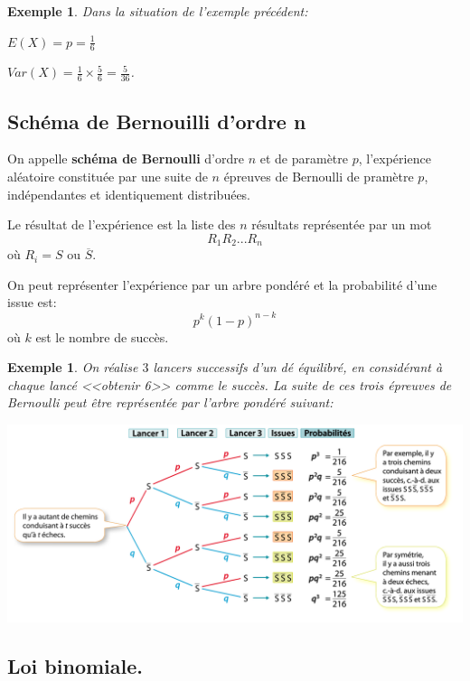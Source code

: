 \documentclass[a4paper,11pt]{article}
\theoremstyle{break}
\newcounter{enonce}
\newtheorem{exemple}[enonce]{Exemple}
\begin{document}
  \begin{exemple}
 Dans la situation de l'exemple précédent:
 
 $E(X)=p=\frac{1}{6}$
 
 $Var(X)=\frac{1}{6} \times \frac{5}{6}=\frac{5}{36}$.
  
 \end{exemple}
 
 \newpage
 \subsection{Schéma de Bernouilli d'ordre n}

  
  \begin{definition}
  On appelle \textbf{schéma de Bernoulli} d'ordre $n$ et de paramètre $p$, 
  l'expérience aléatoire constituée
  par une suite de $n$ épreuves de Bernoulli de pramètre $p$, indépendantes et identiquement distribuées.
  
  Le résultat de l'expérience est la liste des $n$ résultats représentée par un mot
  $$R_1R_2...R_n$$
  où $R_i= S$ ou $\overline{S}$.
  
  On peut représenter l'expérience par un arbre pondéré et la probabilité d'une issue est:
  $$p^k(1-p)^{n-k}$$ où $k$ est le nombre de succès.
 \end{definition}

 
   \begin{exemple}
 On réalise $3$ lancers successifs d'un dé équilibré, en considérant à chaque lancé <<obtenir 6>>
 comme le succès. La suite de ces trois épreuves de Bernoulli peut être représentée par l'arbre pondéré
 suivant:
 
  \includegraphics[scale=0.4]{../Images/arbreBinom.png}
 
  
 \end{exemple}
 
 \subsection{Loi binomiale.}
\end{document}
